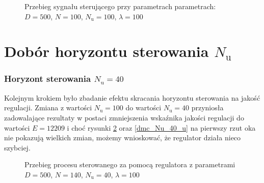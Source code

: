\begin{figure}[b]
    \centering
    \caption{Przebieg sygnału sterującego przy parametrach parametrach: $D = 500$, $N = 100$, $N_{\mathrm{u}} = 100$, $\lambda = 100$}
    \label{dmc_N_100_u}
\end{figure}

\section{Dobór horyzontu sterowania $N_{\mathrm{u}}$}
\subsubsection{Horyzont sterowania $N_{\mathrm{u}} = 40$}
Kolejnym krokiem było zbadanie efektu skracania horyzontu sterowania na jakość regulacji. Zmiana z wartości $N_{\mathrm{u}} = 100$ do wartości $N_{\mathrm{u}} = 40$ przyniosła zadowalające rezultaty w postaci zmniejszenia wskaźnika jakości regulacji do wartości $E = \num{12209}$ i choć rysunki \ref{dmc_Nu_40_y} oraz \ref{dmc_Nu_40_u} na pierwszy rzut oka nie pokazują wielkich zmian, możemy wnioskować, że regulator działa nieco szybciej.

\begin{figure}[t]
    \centering
    \caption{Przebieg procesu sterowanego za pomocą regulatora z parametrami $D = 500$, $N = 140$, $N_{\mathrm{u}} = 40$, $\lambda = 100$}
    \label{dmc_Nu_40_y}
\end{figure}

